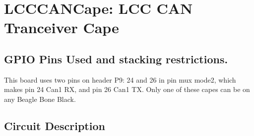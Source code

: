 %
%
%
%
% 
%
%
%
%
%
% 
%

\chapter{LCCCANCape: LCC CAN Tranceiver Cape}

\section{GPIO Pins Used and stacking restrictions.}

This board uses two pins on header P9: 24 and 26 in pin mux mode2, which makes 
pin 24 Can1 RX, and pin 26 Can1 TX.  Only one of these capes can be on any 
Beagle Bone Black.


\section{Circuit Description}


